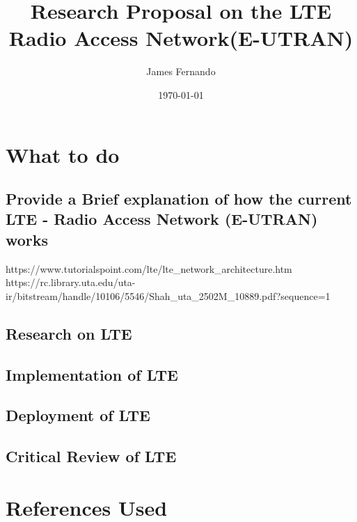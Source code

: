 \documentclass[a4paper,12pt]{scrartcl}
\title{Research Proposal on the LTE Radio Access Network(E-UTRAN)}
\author{James Fernando}
\date{\today}
\begin{document}
	
	\begin{titlepage}
		\maketitle
	\end{titlepage}
	
	\tableofcontents
	\newpage	
	\section{What to do}{
		\subsection{Provide a Brief explanation of how the current LTE - Radio Access Network (E-UTRAN) works}{
			https://www.tutorialspoint.com/lte/lte_network_architecture.htm
			https://rc.library.uta.edu/uta-ir/bitstream/handle/10106/5546/Shah_uta_2502M_10889.pdf?sequence=1
		}
	\subsection{Research on LTE}
	
	\subsection{Implementation of LTE}
	
	\subsection{Deployment of LTE}
	
	\subsection{Critical Review of LTE}
	}
	\section{References Used}
	
	\newpage
	
	\printbibliography[heading=bibintoc,title=References]
\end{document}
